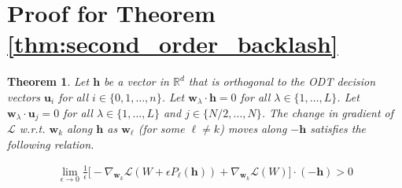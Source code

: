 \documentclass{article}
\theoremstyle{plain}
\newtheorem*{theorem*}{Theorem}
\theoremstyle{definition}
\theoremstyle{remark}
\newcommand{\R}{{\mathbb R}}
\newcommand{\E}{{\mathbf E}}
\newcommand{\1}{{\mathbf 1}}
\newcommand{\0}{{\mathbf 0}}
\newcommand{\h}{{\mathbf h}}
\newcommand{\w}{{\mathbf w}}
\newcommand{\x}{{\mathbf x}}
\newcommand{\bu}{{\mathbf u}}
\renewcommand{\>}{{\rightarrow}}
\begin{document}
\section{Proof for Theorem \ref{thm:second_order_backlash}}
\label{app:second_order_backlash}
\begin{theorem*}
Let $\h$ be a vector in $\R^d$ that is orthogonal to the ODT decision vectors $\bu_i$ for all $i \in \{0,1,\ldots,n\}$. 
Let $\w_\lambda \cdot \h = 0$ for all $\lambda \in\{1,\ldots,L\}$. Let $\w_\lambda \cdot \bu_j = 0$ for all $\lambda \in\{1,\ldots,L\}$ and $j \in \{N/2,\ldots, N\}$. The change in gradient of $\mathcal{L}$ w.r.t. $\w_k$ along $\h$  as $\w_\ell$ (for some $\ell \neq k$) moves along $-\h$ satisfies the following relation.


\begin{align*}
\lim_{\epsilon \to 0} \frac{1}{\epsilon} \bigg[ 
 -\nabla_{\w_k} \mathcal{L}(W + \epsilon P_\ell(\h))  
 + \nabla_{\w_k} \mathcal{L}(W)  \bigg]\cdot (-\h) > 0
\end{align*}
\end{theorem*}
\end{document}
